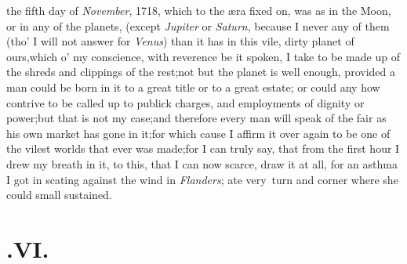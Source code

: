 \documentclass{article}
\begin{document}
 the fifth day of \textit{November},
1718, which to the æra fixed on, was as\break 
{}
\break
{}
in the Moon, or in any of the
planets, (except \textit{Jupiter} or \textit{Saturn}, because I never
 any of them (tho’ I will not answer for \textit{Venus})
than it has in this vile, dirty pla\-net of ours,\tsk  which
o’ my conscience, with reverence be it spoken, I take to be
made up of the shreds and clippings of the rest;\tsh  not
but the planet is well enough, provided a man could be born in it
to a great title or to a great estate; or could any how contrive to
be called up to publick charges, and employments of dignity or
power;\tsh  but that is not my case;\tsh  and
therefore every man will speak of the fair as his own market has
gone in it;\tsk  for which cause I affirm it over
again to be one of the vilest worlds that ever was made;\tsk  for
I can truly say, that from the first hour I drew my breath in it,
to this, that I can now scarce, draw it at all, for an asthma I got
in scating against the wind in \textit{Flanders};\tsk\break
{}
ate very\sic\ turn and corner where she could 
small  sustained.

\null
\section{.\enspace VI.}
\end{document}
